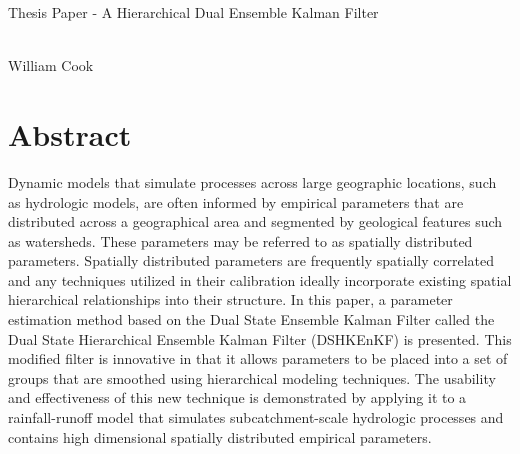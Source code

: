 \documentclass[12pt,twoside]{mitthesis}
\begin{document}
\pagestyle{plain}


\vspace*{\fill}
\begin{center}
\begin{LARGE}
Thesis Paper - A Hierarchical Dual Ensemble Kalman Filter
\end{LARGE}
\\
{\large William Cook}
\end{center}
\vspace*{\fill}
\pagebreak

\section{Abstract}



Dynamic models that simulate processes across large geographic locations, such as hydrologic models, are often informed by empirical parameters that are distributed across a geographical area and segmented by geological features such as watersheds. These parameters may be referred to as spatially distributed parameters. Spatially distributed parameters are frequently spatially correlated and any techniques utilized in their calibration ideally incorporate existing spatial hierarchical relationships into their structure. In this paper, a parameter estimation method based on the Dual State Ensemble Kalman Filter called the Dual State Hierarchical Ensemble Kalman Filter (DSHKEnKF) is presented. This modified filter is innovative in that it allows parameters to be placed into a set of groups that are smoothed using hierarchical modeling techniques. The usability and effectiveness of this new technique is demonstrated by applying it to a rainfall-runoff model that simulates subcatchment-scale hydrologic processes and contains high dimensional spatially distributed empirical parameters.






\appendix
%



\end{document}
